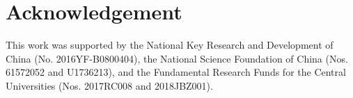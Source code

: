 \documentclass[review,3p,10pt,sort&compress]{elsarticle}
\begin{document}

\section*{Acknowledgement}
This work was supported by the National Key Research and Development of China (No. 2016YF-B0800404), the National Science Foundation of China (Nos. 61572052 and U1736213), and the Fundamental Research Funds for the Central Universities (Nos. 2017RC008 and 2018JBZ001).




\end{document}
